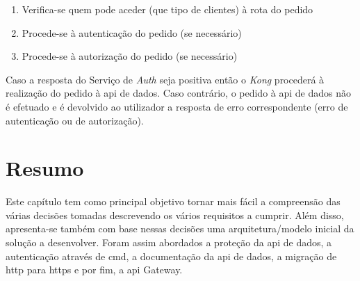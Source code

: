 \begin{enumerate}
    \item Verifica-se quem pode aceder (que tipo de clientes) à rota do pedido
    \item Procede-se à autenticação do pedido (se necessário)
    \item Procede-se à autorização do pedido (se necessário)
\end{enumerate}

Caso a resposta do Serviço de \textit{Auth} seja positiva então o \textit{Kong} procederá à realização do pedido à \acrshort{api} de dados. Caso contrário, o pedido à \acrshort{api} de dados não é efetuado e é devolvido ao utilizador a resposta de erro correspondente (erro de autenticação ou de autorização).

\section{Resumo}

Este capítulo tem como principal objetivo tornar mais fácil a compreensão das várias decisões tomadas descrevendo os vários requisitos a cumprir. Além disso, apresenta-se também com base nessas decisões uma arquitetura/modelo inicial da solução a desenvolver. Foram assim abordados a proteção da \acrshort{api} de dados, a autenticação através de \acrfull{cmd}, a documentação da \acrshort{api} de dados, a migração de \acrshort{http} para \acrshort{https} e por fim, a \acrshort{api} Gateway.
